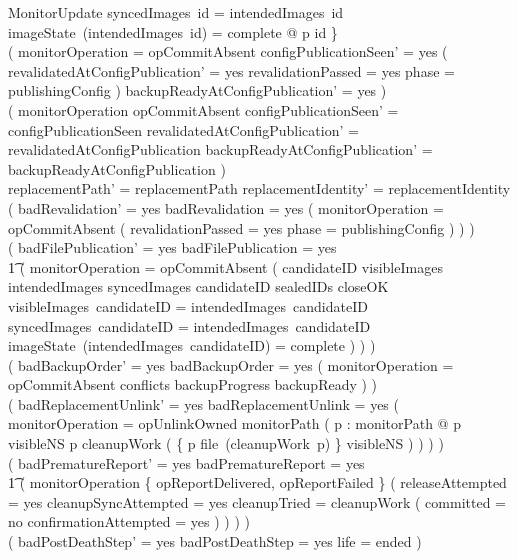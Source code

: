 \documentclass{article}
\begin{document}
\begin{schema}{MonitorUpdate}
	syncedImages~id = intendedImages~id \land
	imageState~(intendedImages~id) = complete @ p \mapsto id \} \\
	( monitorOperation = opCommitAbsent \implies configPublicationSeen' = yes \land
	( revalidatedAtConfigPublication' = yes \iff
	revalidationPassed = yes \land phase = publishingConfig ) \land
	backupReadyAtConfigPublication' = yes ) \\
	( monitorOperation \neq opCommitAbsent \implies
	configPublicationSeen' = configPublicationSeen \land
	revalidatedAtConfigPublication' = revalidatedAtConfigPublication \land
	backupReadyAtConfigPublication' = backupReadyAtConfigPublication ) \\
	replacementPath' = replacementPath \land replacementIdentity' = replacementIdentity \\
	( badRevalidation' = yes \iff badRevalidation = yes \lor
	( monitorOperation = opCommitAbsent \land
	\lnot ( revalidationPassed = yes \land phase = publishingConfig ) ) ) \\
	( badFilePublication' = yes \iff badFilePublication = yes \lor \\
	\t1 ( monitorOperation = opCommitAbsent \land
	\lnot ( candidateID \in \dom visibleImages \cap \dom intendedImages
	\cap \dom syncedImages \land candidateID \in sealedIDs \cap closeOK \land
	visibleImages~candidateID = intendedImages~candidateID \land
	syncedImages~candidateID = intendedImages~candidateID \land
	imageState~(intendedImages~candidateID) = complete ) ) ) \\
	( badBackupOrder' = yes \iff badBackupOrder = yes \lor
	( monitorOperation = opCommitAbsent \land conflicts \neq \emptyset \land
	backupProgress \neq backupReady ) ) \\
	( badReplacementUnlink' = yes \iff badReplacementUnlink = yes \lor
	( monitorOperation = opUnlinkOwned \land monitorPath \neq \emptyset \land
	( \exists p : monitorPath @ p \in \dom visibleNS \land p \in \dom cleanupWork \land
	\lnot ( \{ p \mapsto file~(cleanupWork~p) \} \subseteq visibleNS ) ) ) ) \\
	( badPrematureReport' = yes \iff badPrematureReport = yes \lor \\
	\t1 ( monitorOperation \in \{ opReportDelivered, opReportFailed \} \land
	\lnot ( releaseAttempted = yes \land cleanupSyncAttempted = yes \land
		cleanupTried = \dom cleanupWork \land
			( committed = no \lor confirmationAttempted = yes ) ) ) ) \\
	( badPostDeathStep' = yes \iff badPostDeathStep = yes \lor life = ended ) \\

\end{schema}
\end{document}
